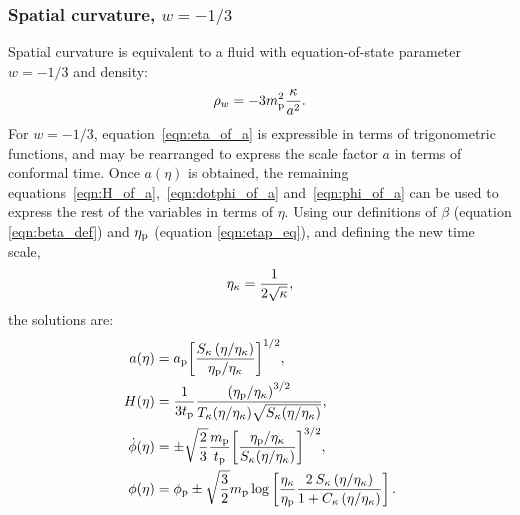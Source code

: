\subsubsection{Spatial curvature, \(w=-1/3\)}
Spatial curvature is equivalent to a fluid with equation-of-state parameter \(w=-1/3\) and density:
\begin{equation}
  \rho_w = -3m_{\mathrm{p}}^2\frac{\kappa}{a^{2}}.
\end{equation}
For \(w=-1/3\), equation~\eqref{eqn:eta_of_a} is expressible in terms of trigonometric functions, and may be rearranged to express the scale factor \(a\) in terms of conformal time. Once \(a(\eta)\) is obtained, the remaining equations~\eqref{eqn:H_of_a},~\eqref{eqn:dotphi_of_a} and~\eqref{eqn:phi_of_a} can be used to express the rest of the variables in terms of \(\eta\). Using our definitions of \(\beta\) (equation \nolinebreak\ref{eqn:beta_def}) and \(\eta_{\mathrm{p}}\) (equation \nolinebreak\ref{eqn:etap_eq}), and defining the new time scale,
\begin{equation}
  \eta_\mathrm{\kappa} = \frac{1}{2\sqrt{\kappa}},
  \label{eqn:etak}
\end{equation}
the solutions are:
\begin{align}
  a(\eta)
  &=
  a_{\mathrm{p}}{\left[
  \frac
  {S_\kappa\left(\eta/\eta_\mathrm{\kappa}\right)}
  {\eta_{\mathrm{p}}/\eta_\mathrm{\kappa}} \right]}^{1/2},
  \\
  H(\eta)
  &=
  \frac{1}{3t_{\mathrm{p}}}
  \frac{{(\eta_{\mathrm{p}}/\eta_\mathrm{\kappa})}^{3/2}}
  {T_\kappa(\eta/\eta_\mathrm{\kappa})\sqrt{S_\kappa(\eta/\eta_\mathrm{\kappa})}}, 
  \\
  \dot{\phi}(\eta)
  &=
  \pm\sqrt{\frac{2}{3}}
  \frac{m_{\mathrm{p}}}{t_{\mathrm{p}}}
  {\left[
  \frac
  {\eta_{\mathrm{p}}/\eta_\mathrm{\kappa}}
  {S_{\kappa}(\eta/\eta_\mathrm{\kappa})}
  \right]}^{3/2},
  \\
  \phi(\eta) 
  &=
  \phi_{\mathrm{p}} \pm \sqrt{\frac{3}{2}}m_{\mathrm{p}}\log  \left[
  \frac{\eta_\mathrm{\kappa}}{\eta_{\mathrm{p}}} 
  \frac{2\:S_{\kappa}\left(\eta/\eta_\mathrm{\kappa} \right) }
  {1 + C_{\kappa} \left( \eta/\eta_\mathrm{\kappa} \right)   }  
  \right]. 
\end{align}



